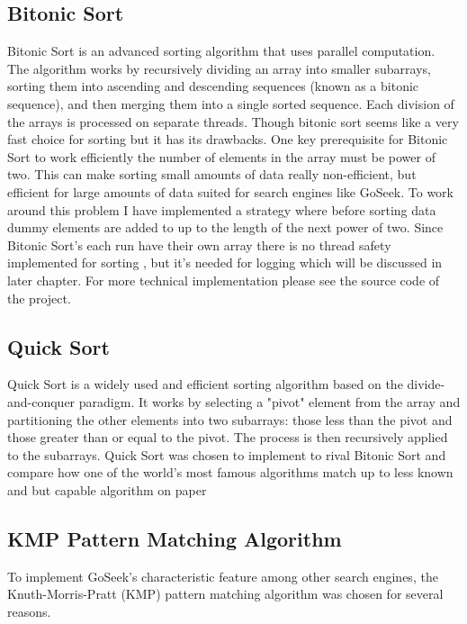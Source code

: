 \subsection{Bitonic Sort}
Bitonic Sort \cite{bitonic_sorter}is an advanced sorting algorithm that uses parallel computation.\\
The algorithm works by recursively dividing an array into smaller subarrays, sorting them into ascending and descending sequences (known as a bitonic sequence), and then merging them into a single sorted sequence. Each division of the arrays is processed on separate threads. Though bitonic sort seems like a very fast choice for sorting but  it has its drawbacks. One key prerequisite for Bitonic Sort to work efficiently the number of elements in the array must be power of two. This can make sorting small amounts of data really non-efficient, but efficient for large amounts of data suited for search engines like GoSeek. To work around this problem I have implemented a strategy where before sorting data dummy elements are added to up to the length of the next power of two. Since Bitonic Sort's each run have their own array there is no thread safety implemented for sorting , but it's needed for logging which will be discussed in later chapter. For more technical implementation please see the source code of the project.


\subsection{Quick Sort}
Quick Sort\cite{quicksort} is a widely used and efficient sorting algorithm based on the divide-and-conquer paradigm. It works by selecting a "pivot" element from the array and partitioning the other elements into two subarrays: those less than the pivot and those greater than or equal to the pivot. The process is then recursively applied to the subarrays. Quick Sort was chosen to implement to rival Bitonic Sort and compare how one of the world's most famous algorithms match up to less known and but capable algorithm on paper
\subsection{KMP Pattern Matching Algorithm}

To implement GoSeek's characteristic feature among other search engines, the Knuth-Morris-Pratt (KMP) pattern matching algorithm was chosen for several reasons.

